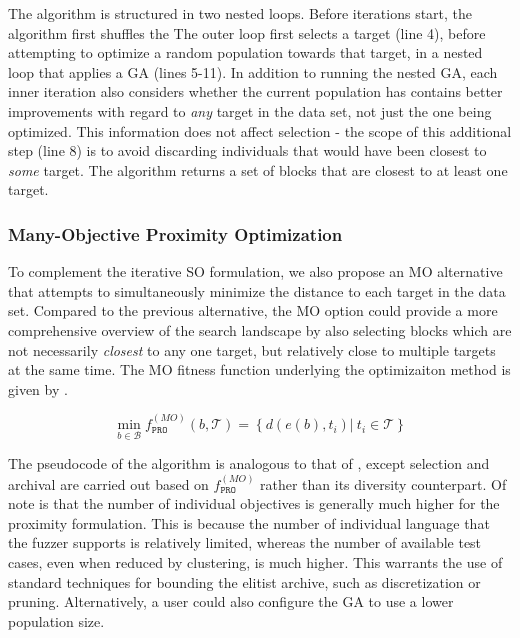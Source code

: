 The algorithm is structured in two nested loops.
Before iterations start, the algorithm first shuffles
the 
The outer loop first selects a target (line 4),
before attempting to optimize a random population towards that target,
in a nested loop that applies a \gls{GA} (lines 5-11).
In addition to running the nested \gls{GA},
each inner iteration also considers whether the current population has
contains better improvements with regard to \textit{any}
target in the data set, not just the one being optimized.
This information does not affect selection -  the scope of this
additional step (line 8) is to avoid discarding individuals
that would have been closest to \textit{some} target.
The algorithm returns a set of blocks that are closest to at least one target.

\subsubsection{Many-Objective Proximity Optimization}

To complement the iterative \gls{SO} formulation, we also propose
an \gls{MO} alternative that attempts to simultaneously minimize the distance
to each target in the data set.
Compared to the previous alternative, the \gls{MO} option could provide a
more comprehensive overview of the search landscape by also
selecting blocks which are not necessarily \textit{closest}
to any one target, but relatively close to multiple targets at the same time.
The \gls{MO} fitness function underlying the optimizaiton method
is given by .


\begin{equation}
\min_{b \in \mathcal{B}} f^{(MO)}_{\texttt{PRO}}(b, \mathcal{T}) = \left\lbrace d(e(b), t_i)|~t_i \in \mathcal{T} \right\rbrace
\label{eq:proximity_mo}
\end{equation}

The pseudocode of the algorithm is analogous to that of , 
except selection and archival are carried out based on $f^{(MO)}_{\texttt{PRO}}$
rather than its diversity counterpart.
Of note is that the number of individual objectives is generally
much higher for the proximity formulation.
This is because the number of individual language that the fuzzer supports
is relatively limited, whereas the number of available test cases, even
when reduced by clustering, is much higher.
This warrants the use of standard techniques for bounding the elitist archive, such
as discretization or pruning.
Alternatively, a user could also configure the \gls{GA} to use a lower population size.

